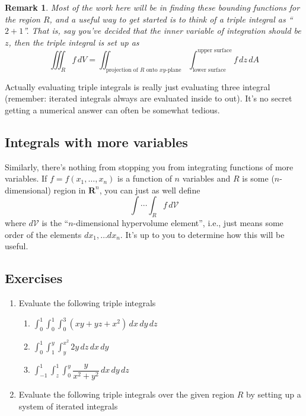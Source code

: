 \documentclass[12pt]{article}
\numberwithin{equation}{subsection}
\numberwithin{figure}{subsection}
\theoremstyle{note}
\newtheorem{remark}[subsection]{Remark}
\begin{document}
{\begin{remark} Most of the work here will be in finding these bounding functions for the region $R$, and a useful way to get started is to think of a triple integral as ``$2+1$''. That is, say you've decided that the inner variable of integration should be $z$, then the triple integral is set up as \[ \iiint_R f\,dV=\iint_{\text{projection of $R$ onto $xy$-plane}} \int_{\text{lower surface}}^{\text{upper surface}} f\,dz\,dA\] \end{remark}


Actually evaluating triple integrals is really just evaluating three integral (remember: iterated integrals always are evaluated inside to out). It's no secret getting a numerical answer can often be somewhat tedious. 
	
\subsection{Integrals with more variables} 
	 Similarly, there's nothing from stopping you from integrating functions of more variables. If $f=f(x_1,\dots,x_n)$ is a function of $n$ variables and $R$ is some ($n$-dimensional) region in $\mathbf{R}^n$, you can just as well define \begin{equation} \int \cdots \int_R f\,d\mathcal{V}\end{equation} where $d\mathcal{V}$ is the ``$n$-dimensional hypervolume element'', i.e.,  just means some order of the elements $dx_1, \dots dx_n$. It's up to you to determine how this will be useful. 


\subsection{Exercises}
\begin{enumerate}[label=\arabic*.]
\item Evaluate the following triple integrals

\begin{enumerate}
	\item $\displaystyle \int_0^1 \int_0^1 \int_0^3 (xy+yz+x^2) \,dx\,dy\,dz$
	\item $\displaystyle \int_0^1 \int_1^y \int_y^{x^2} 2y \,dz\,dx\,dy$
	\item $\displaystyle \int_{-1}^1 \int_z^1 \int_0^{y} \dfrac{y}{x^2+y^2} \,dx\,dy\,dz$
\end{enumerate}

\item Evaluate the following triple integrals over the given region $R$ by setting up a system of iterated integrals


\end{enumerate}}
\end{document}
